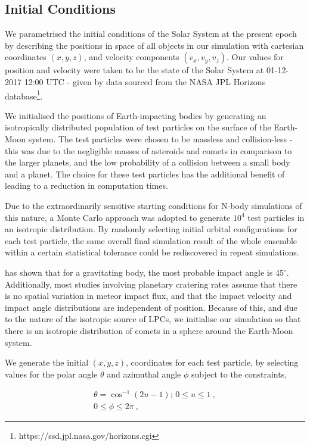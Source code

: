 \subsection{Initial Conditions}

We parametrised the initial conditions of the Solar System at the present epoch by describing the positions in space of all objects in our simulation with cartesian coordinates $(x,y,z)$, and velocity components $(v_x, v_y, v_z)$. Our values for position and velocity were taken to be the state of the Solar System at 01-12-2017 12:00 UTC - given by data sourced from the NASA JPL Horizons database\footnote{https://ssd.jpl.nasa.gov/horizons.cgi}.

We initialised the positions of Earth-impacting bodies by generating an isotropically distributed population of test particles on the surface of the Earth-Moon system. The test particles were chosen to be massless and collision-less -  this was due to the negligible masses of asteroids and comets in comparison to the larger planets, and the low probability of a collision between a small body and a planet. The choice for these test particles has the additional benefit of leading to a reduction in computation times.

Due to the extraordinarily sensitive starting conditions for N-body simulations of this nature, a Monte Carlo approach was adopted to generate $10^4$ test particles in an isotropic distribution. By randomly selecting initial orbital configurations for each test particle, the same overall final simulation result of the whole ensemble within a certain statistical tolerance could be rediscovered in repeat simulations.

\cite{shoemaker1962interpretation} has shown that for a gravitating body, the most probable impact angle is 45$^\circ$. Additionally, most studies involving planetary cratering rates assume that there is no spatial variation in meteor impact flux, and that the impact velocity and impact angle distributions are independent of position. Because of this, and due to the nature of the isotropic source of LPCs, we initialise our simulation so that there is an isotropic distribution of comets in a sphere around the Earth-Moon system.

We generate the initial $(x,y,z)$, coordinates for each test particle, by selecting values for the polar angle $\theta$ and azimuthal angle $\phi$ subject to the constraints,

\begin{equation}
  \begin{gathered}
    \theta = \cos^{-1}(2u-1); \, 0 \leq u \leq 1~, \\
    0 \leq \phi \leq 2\pi~,
\end{gathered}  
\end{equation}

